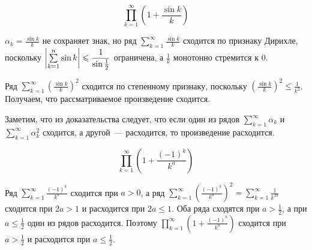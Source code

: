 \documentclass[../../main.tex]{subfiles}
\begin{document}
	\begin{example}
		\[\prod\limits_{k = 1}^{\infty} \left(1 + \frac{\sin k}{k}\right)\]
		
		$\alpha_k = \frac{\sin k}{k}$ не сохраняет знак, но ряд $\sum\limits_{k = 
		1}^{\infty} \frac{\sin k}{k}$ сходится по признаку Дирихле, поскольку 
		${\left|{ 
		\sum\limits_{k = 1}^{n} \sin k}\right| \leqslant \dfrac{1}{\sin \frac{1}{2}}}$ 
		ограничена, а $\frac{1}{k}$ монотонно стремится к $0$.
		
		Ряд $\sum\limits_{k = 1}^{\infty} \left(\frac{\sin k}{k}\right)^2$ сходится 
		по степенному признаку, 
		поскольку $\left(\frac{\sin k}{k}\right)^2 \leq \frac{1}{k^2}$.
		Получаем, что 
		рассматриваемое произведение сходится.
	\end{example}

	Заметим, что из доказательства следует, что если один из рядов 
	$\sum\limits_{k = 1}^{\infty} \alpha_k$ и $\sum\limits_{k = 1}^{\infty} 
	\alpha_k^2$ сходится, а другой~--- расходится, то произведение расходится.
	
	\begin{example}


		\[\prod\limits_{k = 1}^{\infty} \left(1 + \frac{(-1)^k}{k^a}\right)\]
		
		Ряд $\sum\limits_{k = 1}^{\infty} \frac{(-1)^k}{k^a}$ сходится при $a > 0$, 
		а ряд $\sum\limits_{k = 1}^{\infty} \left(\frac{(-1)^k}{k^a}\right)^2 = 
		\sum\limits_{k = 1}^{\infty} \frac{1}{k^{2a}}$ сходится при $2a > 1$ и 
		расходится при $2a \leq 1$. Оба ряда сходятся при $a > \frac{1}{2}$, а при 
		$a 
		\leq \frac{1}{2}$ один из рядов расходится. Поэтому $\prod\limits_{k = 
		1}^{\infty} 
		\left(1 + \frac{(-1)^k}{k^a}\right)$ сходится при $a > \frac{1}{2}$ и
		расходится при $a \leq \frac{1}{2}$.
	\end{example}
	
\end{document}
